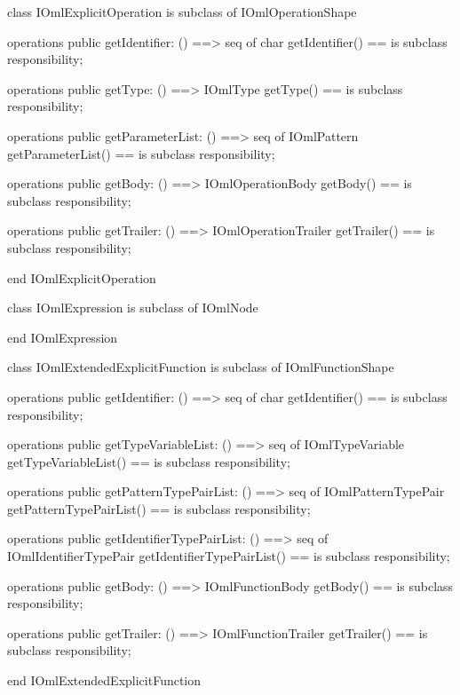 \begin{vdm_al}
class IOmlExplicitOperation
 is subclass of IOmlOperationShape

operations
  public getIdentifier: () ==> seq of char
  getIdentifier() == is subclass responsibility;

operations
  public getType: () ==> IOmlType
  getType() == is subclass responsibility;

operations
  public getParameterList: () ==> seq of IOmlPattern
  getParameterList() == is subclass responsibility;

operations
  public getBody: () ==> IOmlOperationBody
  getBody() == is subclass responsibility;

operations
  public getTrailer: () ==> IOmlOperationTrailer
  getTrailer() == is subclass responsibility;

end IOmlExplicitOperation
\end{vdm_al}

\begin{vdm_al}
class IOmlExpression
 is subclass of IOmlNode

end IOmlExpression
\end{vdm_al}

\begin{vdm_al}
class IOmlExtendedExplicitFunction
 is subclass of IOmlFunctionShape

operations
  public getIdentifier: () ==> seq of char
  getIdentifier() == is subclass responsibility;

operations
  public getTypeVariableList: () ==> seq of IOmlTypeVariable
  getTypeVariableList() == is subclass responsibility;

operations
  public getPatternTypePairList: () ==> seq of IOmlPatternTypePair
  getPatternTypePairList() == is subclass responsibility;

operations
  public getIdentifierTypePairList: () ==> seq of IOmlIdentifierTypePair
  getIdentifierTypePairList() == is subclass responsibility;

operations
  public getBody: () ==> IOmlFunctionBody
  getBody() == is subclass responsibility;

operations
  public getTrailer: () ==> IOmlFunctionTrailer
  getTrailer() == is subclass responsibility;

end IOmlExtendedExplicitFunction
\end{vdm_al}


